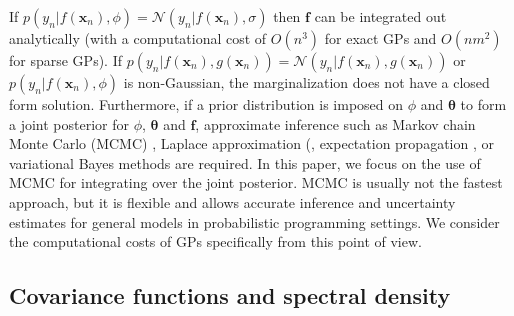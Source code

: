 \documentclass[onecolumn,a4paper,11pt]{article}
\begin{document}

If $p(y_n|f(\bm{x}_n),\phi)=\mathcal{N}(y_n|f(\bm{x}_n),\sigma)$ then $\bm{f}$ can be integrated out analytically (with a computational cost of $O(n^3)$ for exact GPs and $O(nm^2)$ for sparse GPs). If $p(y_n|f(\bm{x}_n),g(\bm{x}_n))=\mathcal{N}(y_n|f(\bm{x}_n),g(\bm{x}_n))$ or $p(y_n|f(\bm{x}_n),\phi)$ is non-Gaussian, the marginalization does not have a closed form solution. Furthermore, if a prior distribution is imposed on $\phi$ and $\bm{\theta}$ to form a joint posterior for $\phi$, $\bm{\theta}$ and $\bm{f}$, approximate inference such as Markov chain Monte Carlo (MCMC) \citep{brooks_2011}, Laplace approximation (\citep{williams1998bayesian,rasmussen2006gaussian}, expectation propagation \citep{minka2001expectation}, or variational Bayes methods \citep{gibbs2000variational,csato2000efficient} are required. In this paper, we focus on the use of MCMC for integrating over the joint
posterior. MCMC is usually not the fastest approach, but it is flexible and allows
accurate inference and uncertainty estimates for general models in probabilistic programming
settings. We consider the computational costs of GPs specifically from
this point of view.

\subsection{Covariance functions and spectral density}\label{ch4_sec_cov}
\end{document}
